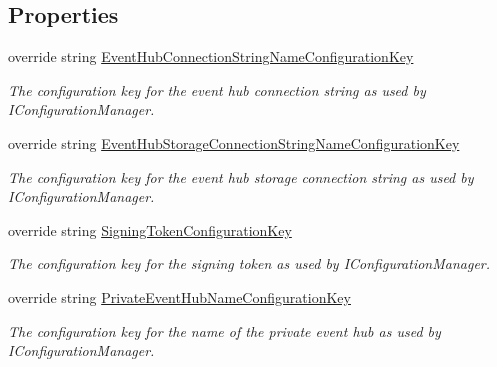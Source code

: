\subsection*{Properties}
\begin{DoxyCompactItemize}
\item 
override string \hyperlink{classCqrs_1_1Azure_1_1ServiceBus_1_1AzureEventHubBus_a4ab2143b01ac269db357fa9dff613a4a_a4ab2143b01ac269db357fa9dff613a4a}{Event\+Hub\+Connection\+String\+Name\+Configuration\+Key}
\begin{DoxyCompactList}\small\item\em The configuration key for the event hub connection string as used by I\+Configuration\+Manager. \end{DoxyCompactList}\item 
override string \hyperlink{classCqrs_1_1Azure_1_1ServiceBus_1_1AzureEventHubBus_a56af12dd26c6a34ba444dcc8b0110337_a56af12dd26c6a34ba444dcc8b0110337}{Event\+Hub\+Storage\+Connection\+String\+Name\+Configuration\+Key}
\begin{DoxyCompactList}\small\item\em The configuration key for the event hub storage connection string as used by I\+Configuration\+Manager. \end{DoxyCompactList}\item 
override string \hyperlink{classCqrs_1_1Azure_1_1ServiceBus_1_1AzureEventHubBus_ae0c61b32cf3f7f12fc975a12f077eaf1_ae0c61b32cf3f7f12fc975a12f077eaf1}{Signing\+Token\+Configuration\+Key}
\begin{DoxyCompactList}\small\item\em The configuration key for the signing token as used by I\+Configuration\+Manager. \end{DoxyCompactList}\item 
override string \hyperlink{classCqrs_1_1Azure_1_1ServiceBus_1_1AzureEventHubBus_a2ad236850ff85bdb8dcc252af7b123c7_a2ad236850ff85bdb8dcc252af7b123c7}{Private\+Event\+Hub\+Name\+Configuration\+Key}
\begin{DoxyCompactList}\small\item\em The configuration key for the name of the private event hub as used by I\+Configuration\+Manager. \end{DoxyCompactList}\item 

\end{DoxyCompactItemize}
